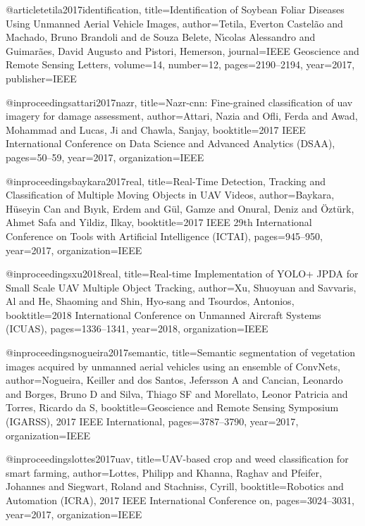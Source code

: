 @article{tetila2017identification,
  title={Identification of Soybean Foliar Diseases Using Unmanned Aerial Vehicle Images},
  author={Tetila, Everton Castel{\~a}o and Machado, Bruno Brandoli and de Souza Belete, N{\'\i}colas Alessandro and Guimar{\~a}es, David Augusto and Pistori, Hemerson},
  journal={IEEE Geoscience and Remote Sensing Letters},
  volume={14},
  number={12},
  pages={2190--2194},
  year={2017},
  publisher={IEEE}
}

@inproceedings{attari2017nazr,
  title={Nazr-cnn: Fine-grained classification of uav imagery for damage assessment},
  author={Attari, Nazia and Ofli, Ferda and Awad, Mohammad and Lucas, Ji and Chawla, Sanjay},
  booktitle={2017 IEEE International Conference on Data Science and Advanced Analytics (DSAA)},
  pages={50--59},
  year={2017},
  organization={IEEE}
}

@inproceedings{baykara2017real,
  title={Real-Time Detection, Tracking and Classification of Multiple Moving Objects in UAV Videos},
  author={Baykara, H{\"u}seyin Can and B{\i}y{\i}k, Erdem and G{\"u}l, Gamze and Onural, Deniz and {\"O}zt{\"u}rk, Ahmet Safa and Yildiz, Ilkay},
  booktitle={2017 IEEE 29th International Conference on Tools with Artificial Intelligence (ICTAI)},
  pages={945--950},
  year={2017},
  organization={IEEE}
}

@inproceedings{xu2018real,
  title={Real-time Implementation of YOLO+ JPDA for Small Scale UAV Multiple Object Tracking},
  author={Xu, Shuoyuan and Savvaris, Al and He, Shaoming and Shin, Hyo-sang and Tsourdos, Antonios},
  booktitle={2018 International Conference on Unmanned Aircraft Systems (ICUAS)},
  pages={1336--1341},
  year={2018},
  organization={IEEE}
}

@inproceedings{nogueira2017semantic,
  title={Semantic segmentation of vegetation images acquired by unmanned aerial vehicles using an ensemble of ConvNets},
  author={Nogueira, Keiller and dos Santos, Jefersson A and Cancian, Leonardo and Borges, Bruno D and Silva, Thiago SF and Morellato, Leonor Patricia and Torres, Ricardo da S},
  booktitle={Geoscience and Remote Sensing Symposium (IGARSS), 2017 IEEE International},
  pages={3787--3790},
  year={2017},
  organization={IEEE}
}

@inproceedings{lottes2017uav,
  title={UAV-based crop and weed classification for smart farming},
  author={Lottes, Philipp and Khanna, Raghav and Pfeifer, Johannes and Siegwart, Roland and Stachniss, Cyrill},
  booktitle={Robotics and Automation (ICRA), 2017 IEEE International Conference on},
  pages={3024--3031},
  year={2017},
  organization={IEEE}
}

